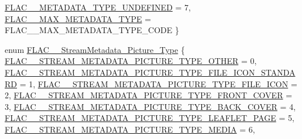 \begin{DoxyCompactItemize}
\mbox{\hyperlink{group__flac__format_ggac71714ba8ddbbd66d26bb78a427fac01acf6ac61fcc866608f5583c275dc34d47}{F\+L\+A\+C\+\_\+\+\_\+\+M\+E\+T\+A\+D\+A\+T\+A\+\_\+\+T\+Y\+P\+E\+\_\+\+U\+N\+D\+E\+F\+I\+N\+ED}} = 7, 
\newline
\mbox{\hyperlink{group__flac__format_ggac71714ba8ddbbd66d26bb78a427fac01a1a2f283a3dd9e7b46181d7a114ec5805}{F\+L\+A\+C\+\_\+\+\_\+\+M\+A\+X\+\_\+\+M\+E\+T\+A\+D\+A\+T\+A\+\_\+\+T\+Y\+PE}} = F\+L\+A\+C\+\_\+\+\_\+\+M\+A\+X\+\_\+\+M\+E\+T\+A\+D\+A\+T\+A\+\_\+\+T\+Y\+P\+E\+\_\+\+C\+O\+DE
 \}
\item 
enum \mbox{\hyperlink{group__flac__format_gaf6d3e836cee023e0b8d897f1fdc9825d}{F\+L\+A\+C\+\_\+\+\_\+\+Stream\+Metadata\+\_\+\+Picture\+\_\+\+Type}} \{ \newline
\mbox{\hyperlink{group__flac__format_ggaf6d3e836cee023e0b8d897f1fdc9825dadd6d6af32499b1973e48c9e8f13357ce}{F\+L\+A\+C\+\_\+\+\_\+\+S\+T\+R\+E\+A\+M\+\_\+\+M\+E\+T\+A\+D\+A\+T\+A\+\_\+\+P\+I\+C\+T\+U\+R\+E\+\_\+\+T\+Y\+P\+E\+\_\+\+O\+T\+H\+ER}} = 0, 
\mbox{\hyperlink{group__flac__format_ggaf6d3e836cee023e0b8d897f1fdc9825da5eca52e5cfcb718f33f5fce9b1021a49}{F\+L\+A\+C\+\_\+\+\_\+\+S\+T\+R\+E\+A\+M\+\_\+\+M\+E\+T\+A\+D\+A\+T\+A\+\_\+\+P\+I\+C\+T\+U\+R\+E\+\_\+\+T\+Y\+P\+E\+\_\+\+F\+I\+L\+E\+\_\+\+I\+C\+O\+N\+\_\+\+S\+T\+A\+N\+D\+A\+RD}} = 1, 
\mbox{\hyperlink{group__flac__format_ggaf6d3e836cee023e0b8d897f1fdc9825daaf44b9d5fb75dde6941463e5029aa351}{F\+L\+A\+C\+\_\+\+\_\+\+S\+T\+R\+E\+A\+M\+\_\+\+M\+E\+T\+A\+D\+A\+T\+A\+\_\+\+P\+I\+C\+T\+U\+R\+E\+\_\+\+T\+Y\+P\+E\+\_\+\+F\+I\+L\+E\+\_\+\+I\+C\+ON}} = 2, 
\mbox{\hyperlink{group__flac__format_ggaf6d3e836cee023e0b8d897f1fdc9825da3e20b405fd4e835ff3a4465b8bcb7c36}{F\+L\+A\+C\+\_\+\+\_\+\+S\+T\+R\+E\+A\+M\+\_\+\+M\+E\+T\+A\+D\+A\+T\+A\+\_\+\+P\+I\+C\+T\+U\+R\+E\+\_\+\+T\+Y\+P\+E\+\_\+\+F\+R\+O\+N\+T\+\_\+\+C\+O\+V\+ER}} = 3, 
\newline
\mbox{\hyperlink{group__flac__format_ggaf6d3e836cee023e0b8d897f1fdc9825da9ae132f2ee7d3baf35f94a9dc9640f62}{F\+L\+A\+C\+\_\+\+\_\+\+S\+T\+R\+E\+A\+M\+\_\+\+M\+E\+T\+A\+D\+A\+T\+A\+\_\+\+P\+I\+C\+T\+U\+R\+E\+\_\+\+T\+Y\+P\+E\+\_\+\+B\+A\+C\+K\+\_\+\+C\+O\+V\+ER}} = 4, 
\mbox{\hyperlink{group__flac__format_ggaf6d3e836cee023e0b8d897f1fdc9825dad3cb471b7925ae5034d9fd9ecfafb87a}{F\+L\+A\+C\+\_\+\+\_\+\+S\+T\+R\+E\+A\+M\+\_\+\+M\+E\+T\+A\+D\+A\+T\+A\+\_\+\+P\+I\+C\+T\+U\+R\+E\+\_\+\+T\+Y\+P\+E\+\_\+\+L\+E\+A\+F\+L\+E\+T\+\_\+\+P\+A\+GE}} = 5, 
\mbox{\hyperlink{group__flac__format_ggaf6d3e836cee023e0b8d897f1fdc9825dac994edc4166107ab5790e49f0b57ffd9}{F\+L\+A\+C\+\_\+\+\_\+\+S\+T\+R\+E\+A\+M\+\_\+\+M\+E\+T\+A\+D\+A\+T\+A\+\_\+\+P\+I\+C\+T\+U\+R\+E\+\_\+\+T\+Y\+P\+E\+\_\+\+M\+E\+D\+IA}} = 6, 

\end{DoxyCompactItemize}
